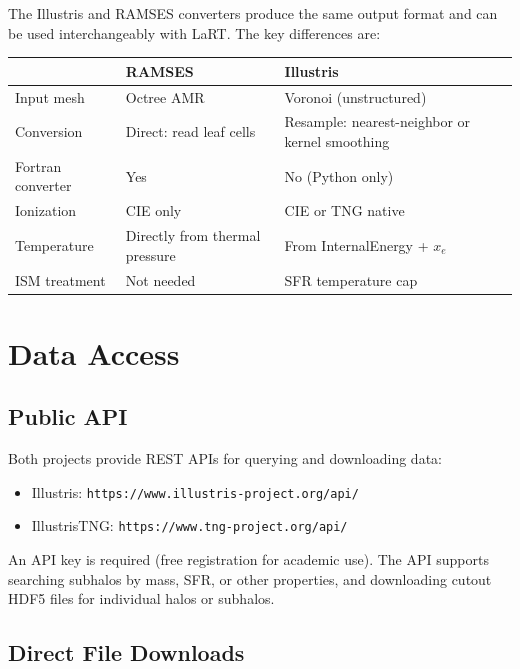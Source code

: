 \documentclass[english,a4paper]{my_memo}
\begin{document}
The Illustris and RAMSES converters produce the same output format and
can be used interchangeably with LaRT.  The key differences are:

\begin{center}
\begin{tabular}{lp{5.5cm}p{5.5cm}}
\toprule
& \textbf{RAMSES} & \textbf{Illustris} \\
\midrule
Input mesh & Octree AMR & Voronoi (unstructured) \\
Conversion & Direct: read leaf cells & Resample: nearest-neighbor or kernel smoothing \\
Fortran converter & Yes & No (Python only) \\
Ionization & CIE only & CIE or TNG native \\
Temperature & Directly from thermal pressure & From InternalEnergy + $x_e$ \\
ISM treatment & Not needed & SFR temperature cap \\
\bottomrule
\end{tabular}
\end{center}


\section{Data Access}
\label{sec:access}

\subsection{Public API}

Both projects provide REST APIs for querying and downloading data:

\begin{itemize}
\item Illustris: \texttt{https://www.illustris-project.org/api/}
\item IllustrisTNG: \texttt{https://www.tng-project.org/api/}
\end{itemize}

An API key is required (free registration for academic use).  The API
supports searching subhalos by mass, SFR, or other properties, and
downloading cutout HDF5 files for individual halos or subhalos.

\subsection{Direct File Downloads}
\end{document}
